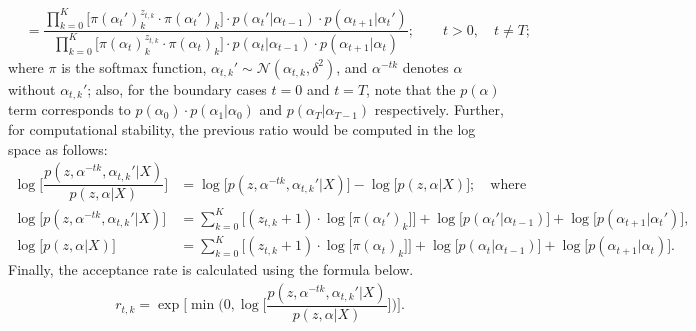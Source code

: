 \documentclass[12pt]{article}
\begin{document}
\begin{enumerate}
\begin{align*}
      &= \dfrac{\prod_{k=0}^K\big[\pi(\alpha_{t}')_k^{z_{t,k}}\cdot \pi(\alpha_{t}')_k\big]\cdot p(\alpha_t'|\alpha_{t-1})\cdot p(\alpha_{t+1}|\alpha_t')}{\prod_{k=0}^K\big[\pi(\alpha_t)_k^{z_{t,k}}\cdot \pi(\alpha_{t})_k\big]\cdot p(\alpha_t|\alpha_{t-1})\cdot p(\alpha_{t+1}|\alpha_t)}; \qquad t > 0, \quad t \neq T;
    \end{align*}
    where $\pi$ is the softmax function, $\alpha_{t,k}' \sim \mathcal{N}(\alpha_{t, k}, \delta^2)$, and $\alpha^{-tk}$ denotes $\alpha$ without $\alpha_{t,k}'$; also, for the boundary cases $t=0$ and $t=T$, note that the $p(\alpha)$ term corresponds to $p(\alpha_{0})\cdot p(\alpha_{1}|\alpha_{0})$ and $p(\alpha_{T}|\alpha_{T-1})$ respectively. Further, for computational stability, the previous ratio would be computed in the log space as follows: 
    \begin{align*}
      \log{\bigg[\dfrac{p(z,\alpha^{-tk},\alpha_{t, k}'|X)}{p(z,\alpha|X)}\bigg]} &= \log{\big[p(z,\alpha^{-tk},\alpha_{t, k}'|X)\big]} - \log{\big[p(z,\alpha|X)\big]}; \quad \mbox{where}\\
      \log{\big[p(z,\alpha^{-tk},\alpha_{t, k}'|X)\big]} &=\sum_{k=0}^K\bigg[(z_{t,k}+1)\cdot\log\big[\pi(\alpha_{t}')_k\big]\bigg] + \log\big[p(\alpha_t'|\alpha_{t-1})\big] + \log\big[p(\alpha_{t+1}|\alpha_t')\big],\\
      \log\big[p(z,\alpha|X)\big] &= \sum_{k=0}^K\bigg[(z_{t,k}+1)\cdot\log\big[\pi(\alpha_{t})_k\big]\bigg] + \log\big[p(\alpha_t|\alpha_{t-1})\big] + \log\big[p(\alpha_{t+1}|\alpha_t)\big].
    \end{align*}
    Finally, the acceptance rate is calculated using the formula below.
    \begin{align*}
      r_{t,k} = \exp\bigg[\min{\bigg(0, \log{\bigg[\dfrac{p(z,\alpha^{-tk},\alpha_{t, k}'|X)}{p(z,\alpha|X)}\bigg]}\bigg)}\bigg].
    \end{align*}



\end{enumerate}
\end{document}
